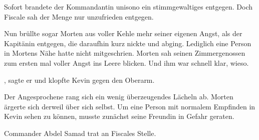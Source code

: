 \par

Sofort brandete der Kommandantin unisono ein stimmgewaltiges  entgegen. Doch Fiscale sah der Menge nur unzufrieden entgegen. 

\par

Nun brüllte sogar Morten aus voller Kehle mehr seiner eigenen Angst, als der Kapitänin entgegen, die daraufhin kurz nickte und abging. Lediglich eine Person in Mortens Nähe hatte nicht mitgeschrien. Morten sah seinen Zimmergenossen zum ersten mal voller Angst ins Leere blicken. Und ihm war schnell klar, wieso.

\par

, sagte er und klopfte Kevin gegen den Oberarm. 

\par

Der Angesprochene rang sich ein wenig überzeugendes Lächeln ab. Morten ärgerte sich derweil über sich selbst. Um eine Person mit normalem Empfinden in Kevin sehen zu können, musste zunächst seine Freundin in Gefahr geraten.

\par

Commander Abdel Samad trat an Fiscales Stelle. 
